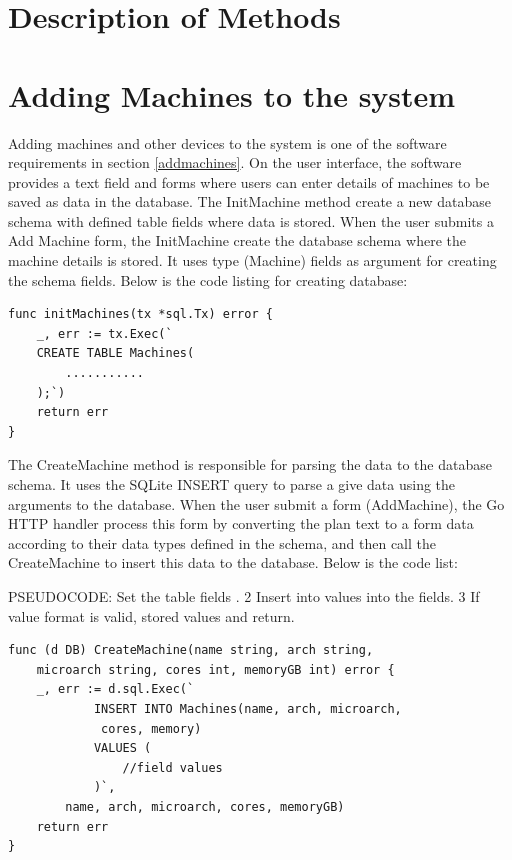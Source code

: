 \section{Description of Methods}
\section*{Adding Machines to the system}
Adding machines and other devices to the system is one of the software requirements in section \ref{addmachines}. On the user interface, the software provides a text field and forms where users can enter details of machines to be saved as data in the database. The InitMachine method create a new database schema with defined table fields where data is stored. When the user submits a Add Machine form, the InitMachine create the database schema where the machine details is stored. It uses type (Machine) fields as argument for creating the schema fields. Below is the code listing for creating database:
\lstset{basicstyle=\footnotesize\ttfamily,breaklines=true}
\lstset{framextopmargin=50pt,frame=bottomline}
\begin{lstlisting}[caption=Creating Database for machine, label=Initializing database]
func initMachines(tx *sql.Tx) error {
	_, err := tx.Exec(`
	CREATE TABLE Machines(
		...........
	);`)
	return err
}
\end{lstlisting}

The CreateMachine method is responsible for parsing the data to the database schema. It uses the SQLite INSERT query to parse a give data using the arguments to the database. When the user submit a form (AddMachine), the Go HTTP handler process this form by converting the plan text to a form data according to their data types defined in the schema, and then call the CreateMachine to insert this data to the database. Below is the code list:

PSEUDOCODE: Set the table fields .
2 Insert into values into the fields.
3 If value format is valid, stored values and return.

\begin{lstlisting}[caption=Adding machines details, label=Adding machine]
func (d DB) CreateMachine(name string, arch string,
	microarch string, cores int, memoryGB int) error {
	_, err := d.sql.Exec(`
			INSERT INTO Machines(name, arch, microarch,
			 cores, memory)
			VALUES (
				//field values
			)`,
		name, arch, microarch, cores, memoryGB)
	return err
}
\end{lstlisting}

